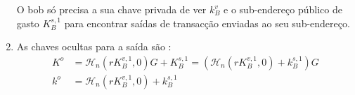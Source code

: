 \begin{enumerate}
    O bob só precisa a sua chave privada de ver $k_B^v$ e o sub-endereço público de gasto $K^{s,1}_B$ para encontrar saídas de transacção enviadas ao seu sub-endereço.   
	
	\item As chaves ocultas para a saída são :
	\begin{align*}
		K^o &= \mathcal{H}_n(r K_B^{v,1},0)G + K_B^{s,1} = (\mathcal{H}_n(r K_B^{v,1},0) + k_B^{s,1})G  \\ 
		k^o &= \mathcal{H}_n(r K_B^{v,1},0) + k_B^{s,1}
	\end{align*}
\end{enumerate}

